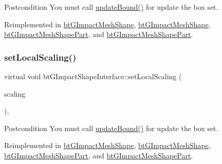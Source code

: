 \begin{DoxyPostcond}{Postcondition}
You must call \hyperlink{classbtGImpactShapeInterface_acb26c2d7a2aecabd06b996b72b848492}{update\+Bound()} for update the box set. 
\end{DoxyPostcond}


Reimplemented in \hyperlink{classbtGImpactMeshShape_aed8d5e4b2e75538109909d44b244bc35}{bt\+G\+Impact\+Mesh\+Shape}, \hyperlink{classbtGImpactMeshShape_aed8d5e4b2e75538109909d44b244bc35}{bt\+G\+Impact\+Mesh\+Shape}, \hyperlink{classbtGImpactMeshShapePart_a2c1de297d020a75e1ab0f10f7c71478f}{bt\+G\+Impact\+Mesh\+Shape\+Part}, and \hyperlink{classbtGImpactMeshShapePart_a2c1de297d020a75e1ab0f10f7c71478f}{bt\+G\+Impact\+Mesh\+Shape\+Part}.

\mbox{\label{classbtGImpactShapeInterface_adec0bd43cd0105b1d0dc172bc7db50d8}} 
\subsubsection{\texorpdfstring{set\+Local\+Scaling()}{setLocalScaling()}\hspace{0.1cm}{\footnotesize\ttfamily [2/2]}}
{\footnotesize\ttfamily virtual void bt\+G\+Impact\+Shape\+Interface\+::set\+Local\+Scaling (\begin{DoxyParamCaption}\item[{const bt\+Vector3 \&}]{scaling }\end{DoxyParamCaption})\hspace{0.3cm}{\ttfamily [inline]}, {\ttfamily [virtual]}}

\begin{DoxyPostcond}{Postcondition}
You must call \hyperlink{classbtGImpactShapeInterface_acb26c2d7a2aecabd06b996b72b848492}{update\+Bound()} for update the box set. 
\end{DoxyPostcond}


Reimplemented in \hyperlink{classbtGImpactMeshShape_aed8d5e4b2e75538109909d44b244bc35}{bt\+G\+Impact\+Mesh\+Shape}, \hyperlink{classbtGImpactMeshShape_aed8d5e4b2e75538109909d44b244bc35}{bt\+G\+Impact\+Mesh\+Shape}, \hyperlink{classbtGImpactMeshShapePart_a2c1de297d020a75e1ab0f10f7c71478f}{bt\+G\+Impact\+Mesh\+Shape\+Part}, and \hyperlink{classbtGImpactMeshShapePart_a2c1de297d020a75e1ab0f10f7c71478f}{bt\+G\+Impact\+Mesh\+Shape\+Part}.

